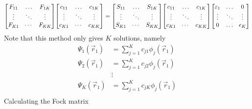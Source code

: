 \documentclass[12pt,a4paper,titlepage]{article}
\begin{document}
\begin{equation}
\mqty[F_{11} & \ldots & F_{1K}\\ \vdots & \ddots & \vdots \\ F_{K1} & \cdots & F_{KK}]\mqty[c_{11} & \ldots & c_{1K}\\ \vdots & \ddots & \vdots \\ c_{K1} & \cdots & c_{KK}]=\mqty[S_{11} & \ldots & S_{1K}\\ \vdots & \ddots & \vdots \\ S_{K1} & \cdots & S_{KK}]\mqty[c_{11} & \ldots & c_{1K}\\ \vdots & \ddots & \vdots \\ c_{K1} & \cdots & c_{KK}]\mqty[\varepsilon_{1} & \ldots & 0\\ \vdots & \ddots & \vdots \\ 0 & \ldots & \epsilon_{K}]
\end{equation}
Note that this method only gives $K$ solutions, namely
\begin{equation}
\begin{aligned}
\Psi_{1}(\vec{r}_{1})&=\sum_{j=1}^{K}c_{j1}\phi_{j}(\vec{r}_{1})\\
\Psi_{2}(\vec{r}_{1})&=\sum_{j=1}^{K}c_{j2}\phi_{j}(\vec{r}_{1})\\
&\vdots\\
\Psi_{K}(\vec{r}_{1})&=\sum_{j=1}^{K}c_{jK}\phi_{j}(\vec{r}_{1})\\
\end{aligned}
\end{equation}
Calculating the Fock matrix
\end{document}
